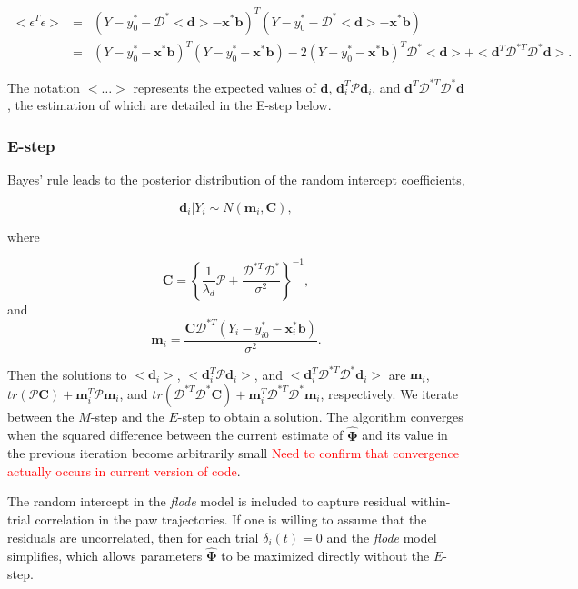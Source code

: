 \documentclass[preprint]{JASA}
\begin{document}
\begin{eqnarray*}
<\epsilon^T\epsilon> &=& (Y- y_{0}^* - \bm{\mathcal{D}}^*<\mathbf{d}> -  \mathbf{x}^*\mathbf{b})^T(Y - y_{0}^* - \bm{\mathcal{D}}^*<\mathbf{d}> -  \mathbf{x}^*\mathbf{b})\\
&=& (Y- y_{0}^* -\mathbf{x}^*\mathbf{b})^T(Y- y_{0}^* -\mathbf{x}^*\mathbf{b}) - 2(Y- y_{0}^* -\mathbf{x}^*\mathbf{b})^T\bm{\mathcal{D}}^*<\mathbf{d}> +<\mathbf{d}^T\bm{\mathcal{D}}^{*T}\bm{\mathcal{D}}^*\mathbf{d}>.
\end{eqnarray*}

\noindent The notation \(<\ldots>\) represents the expected values of
\(\mathbf{d}\), \(\mathbf{d}_i^T\mathcal{P}\mathbf{d}_i\), and
\(\mathbf{d}^T\mathcal{D}^{*T}\mathcal{D}^*\mathbf{d}\), the estimation
of which are detailed in the E-step below.

\hypertarget{e-step}{%
\subsubsection{E-step}\label{e-step}}

Bayes' rule leads to the posterior distribution of the random intercept
coefficients,

\[\mathbf{d}_i | Y_i \sim N\left(\mathbf{m}_i , \mathbf{C}\right),\]

\noindent where

\[\mathbf{C} = \left\{\frac{1}{\lambda_d}\mathcal{P} + \frac{\mathcal{D}^{*T}\mathcal{D}^*}{\sigma^2}\right\}^{-1},\]
\noindent and
\[\mathbf{m}_i = \frac{\mathbf{C} \mathcal{D}^{*T}\left(Y_i - y_{i0}^* -  \mathbf{x}_i^*\mathbf{b}\right)}{\sigma^2}.\]

\noindent Then the solutions to \(<\mathbf{d}_i>\),
\(<\mathbf{d}_i^T\mathcal{P}\mathbf{d}_i>\), and
\(<\mathbf{d}_i^T\mathcal{D}^{*T}\mathcal{D}^*\mathbf{d}_i>\) are
\(\mathbf{m}_i\),
\(tr(\mathcal{P}\mathbf{C}) + \mathbf{m}_i^T\mathcal{P}\mathbf{m}_i\),
and
\(tr( \mathcal{D}^{*T}\mathcal{D}^*\mathbf{C}) + \mathbf{m}_i^T\mathcal{D}^{*T}\mathcal{D}^*\mathbf{m}_i\),
respectively. We iterate between the \(M\)-step and the \(E\)-step to
obtain a solution. The algorithm converges when the squared difference
between the current estimate of \(\widehat{\mathbf{\Phi}}\) and its
value in the previous iteration become arbitrarily small
\textcolor{red}{Need to confirm that convergence actually occurs in current version of code}.

The random intercept in the \emph{flode} model is included to capture
residual within-trial correlation in the paw trajectories. If one is
willing to assume that the residuals are uncorrelated, then for each
trial \(\delta_i(t) = 0\) and the \emph{flode} model simplifies, which
allows parameters \(\widehat{\mathbf{\Phi}}\) to be maximized directly
without the \(E\)-step.
\end{document}
